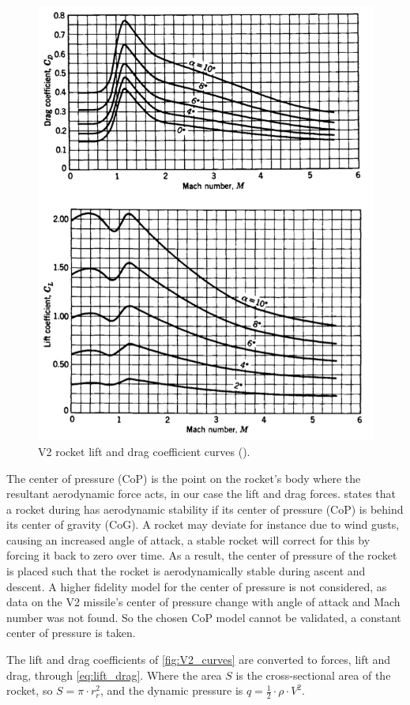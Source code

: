 \begin{figure}[H]
    \centering
    \includegraphics[width=0.75\linewidth]{figures/LiteratureStudy/V2-lift-drag-coefficient (1) (2).png}
    \caption{V2 rocket lift and drag coefficient curves (\cite{sutton_rocket_2016}).}
    \label{fig:V2_curves}
\end{figure}

The center of pressure (CoP) is the point on the rocket's body where the resultant aerodynamic force acts, in our case the lift and drag forces. \cite{TIR-33} states that a rocket during has aerodynamic stability if its center of pressure (CoP) is behind its center of gravity (CoG). A rocket may deviate for instance due to wind gusts, causing an increased angle of attack, a stable rocket will correct for this by forcing it back to zero over time. As a result, the center of pressure of the rocket is placed such that the rocket is aerodynamically stable during ascent and descent. A higher fidelity model for the center of pressure is not considered, as data on the V2 missile's center of pressure change with angle of attack and Mach number was not found. So the chosen CoP model cannot be validated, a constant center of pressure is taken.

The lift and drag coefficients of \autoref{fig:V2_curves} are converted to forces, lift and drag, through \autoref{eq:lift_drag}. Where the area $S$ is the cross-sectional area of the rocket, so $S = \pi \cdot r_r^2$, and the dynamic pressure is $q = \frac{1}{2} \cdot \rho \cdot V^2$.

